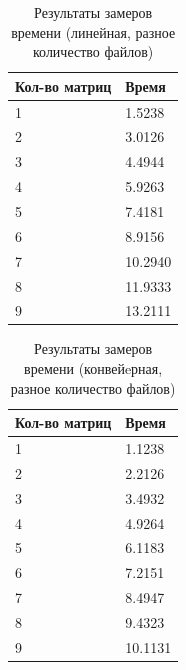 \begin{table}[h]
    \begin{center}
        \begin{threeparttable}
        \captionsetup{justification=raggedright,singlelinecheck=off}
        \caption{Результаты замеров времени (линейная, разное количество файлов)}
        \label{tbl:time_lin_count}
        \begin{tabular}{|p{6cm}|p{6cm}|}
            \hline
            Кол-во матриц & Время \\
            \hline
            1 & 1.5238 \\ \hline 
            2 & 3.0126 \\ \hline 
            3 & 4.4944 \\ \hline 
            4 & 5.9263 \\ \hline 
            5 & 7.4181 \\ \hline 
            6 & 8.9156 \\ \hline 
            7 & 10.2940 \\ \hline 
            8 & 11.9333 \\ \hline 
            9 & 13.2111 \\ \hline  
		\end{tabular}
    \end{threeparttable}
\end{center}
\end{table}


\begin{table}[h]
    \begin{center}
        \begin{threeparttable}
        \captionsetup{justification=raggedright,singlelinecheck=off}
        \caption{Результаты замеров времени (конвейeрная, разное количество файлов)}
        \label{tbl:time_conv_count}
        \begin{tabular}{|p{6cm}|p{6cm}|}
            \hline
            Кол-во матриц & Время \\
            \hline
            1 & 1.1238 \\ \hline 
            2 & 2.2126 \\ \hline 
            3 & 3.4932 \\ \hline 
            4 & 4.9264 \\ \hline 
            5 & 6.1183 \\ \hline 
            6 & 7.2151 \\ \hline 
            7 & 8.4947 \\ \hline 
            8 & 9.4323 \\ \hline 
            9 & 10.1131 \\ \hline
		\end{tabular}
    \end{threeparttable}
\end{center}
\end{table}


